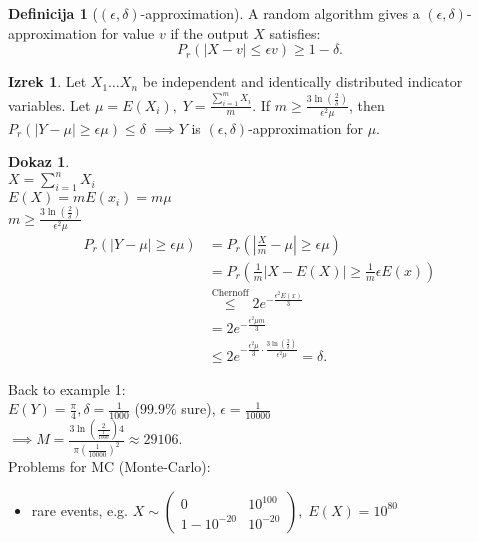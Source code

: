 \documentclass[a4paper, 12pt]{book}
\theoremstyle{definition}
\newtheorem{defn}[counter]{Definicija}
\newtheorem{theorem}[counter]{Izrek}
\newtheorem{pro}[counter]{Dokaz}
\theoremstyle{remark}
\begin{document}
\begin{defn}[$(\epsilon,\delta)$-approximation]
  A random algorithm gives a $(\epsilon,\delta)$-approximation for value $v$ if the output $X$ satisfies:
  \begin{equation*}
    P_r(|X-v| \leq \epsilon v) \geq 1 - \delta.
  \end{equation*}
\end{defn}
\begin{theorem}
  Let $X_1 \dots X_n$ be independent and identically distributed indicator variables.
  Let $\mu = E(X_i), \; Y = \frac{\sum_{i=1}^{m} X_i}{m}$.
  If $m \geq \frac{3 \ln\left(\frac{2}{\delta}\right)}{\epsilon^2 \mu}$, then $P_r(|Y-\mu| \geq \epsilon \mu) \leq \delta$
  $\implies Y$ is $(\epsilon,\delta)$-approximation for $\mu$.
\end{theorem}
\begin{pro} \text{} \\
  $X = \sum_{i=1}^{n} X_i$ \\
  $E(X) = m E(x_i) = m \mu$ \\
  $m \geq \frac{3 \ln\left(\frac{2}{\delta}\right)}{\epsilon^2 \mu}$
  \begin{align*}
    P_r(|Y-\mu| \geq \epsilon \mu) &= P_r(\left|\frac{X}{m}-\mu\right| \geq \epsilon \mu) \\
    &= P_r(\frac{1}{m} \left|X-E(X)\right| \geq \frac{1}{m} \epsilon E(x)) \\
    &\stackrel{\text{Chernoff}}{\leq} 2 e^{-\frac{\epsilon^2 E(x)}{3}} \\
    &= 2 e^{-\frac{\epsilon^2 \mu m}{3}} \\
    &\leq 2 e^{-\frac{\epsilon^2 \mu}{3} \cdot \frac{3 \ln\left(\frac{2}{\delta}\right)}{\epsilon^2 \mu}} = \delta.
  \end{align*}
\end{pro}
Back to example 1: \\
$E(Y) = \frac{\pi}{4}, \delta = \frac{1}{1000}$ ($99.9\%$ sure), $\epsilon = \frac{1}{10000}$ \\
$\implies M = \frac{3 \ln\left(\frac{2}{\frac{1}{1000}}\right) 4}{\pi \left(\frac{1}{10000}\right)^2} \approx 29106$. \\
Problems for MC (Monte-Carlo):
\begin{itemize}
  \item rare events, e.g. $X \sim \begin{pmatrix}0 & 10^{100} \\ 1-10^{-20} & 10^{-20}\end{pmatrix}, \; E(X) = 10^{80}$
\end{itemize}
\end{document}
